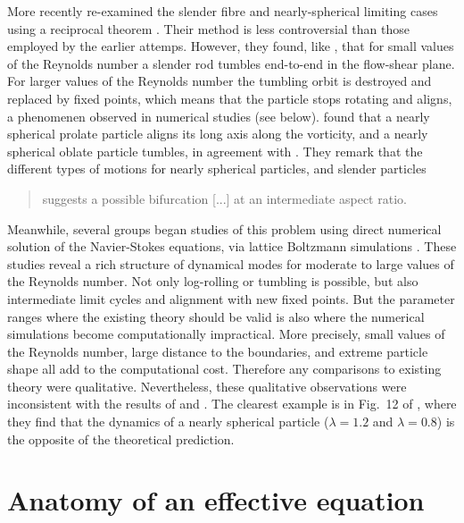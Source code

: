 \documentclass[thesis.tex]{subfiles}
\begin{document}
More recently \citet{subramanian2005,subramanian2006} re-examined the slender fibre and nearly-spherical limiting cases using a reciprocal theorem \cite{kim1991,lovalenti1993}. Their method is less controversial than those employed by the earlier attemps. However, they found, like \citet{harper1968}, that for small values of the Reynolds number a slender rod tumbles end-to-end in the flow-shear plane. For larger values of the Reynolds number the tumbling orbit is destroyed and replaced by fixed points, which means that the particle stops rotating and aligns, a phenomenen observed in numerical studies \cite{ding2000} (see below). \citet{subramanian2006} found that a nearly spherical prolate particle aligns its long axis along the vorticity, and a nearly spherical oblate particle tumbles, in agreement with \citet{saffman1956}. They remark that the different types of motions for nearly spherical particles, and slender particles \blockquote{suggests a possible bifurcation [...] at an intermediate aspect ratio.}

Meanwhile, several groups began studies of this problem using direct numerical solution of the Navier-Stokes equations, via lattice Boltzmann simulations \cite{feng1995,ding2000,qi2003,yu2007,huang2012,rosen2014,mao2014,rosen2015a,rosen2015b}. These studies reveal a rich structure of dynamical modes for moderate to large values of the Reynolds number. Not only log-rolling or tumbling is possible, but also intermediate limit cycles and alignment with new fixed points.
But the parameter ranges where the existing theory should be valid is also where the numerical simulations become computationally impractical. More precisely, small values of the Reynolds number, large distance to the boundaries, and extreme particle shape all add to the computational cost. Therefore any comparisons to existing theory were qualitative. Nevertheless, these qualitative observations were inconsistent with the results of \citet{saffman1956} and \cite{subramanian2006}. The clearest example is in Fig.~12 of \citet{mao2014}, where they find that the dynamics of a nearly spherical particle ($\lambda=1.2$ and $\lambda=0.8$) is the opposite of the theoretical prediction. 





\section{Anatomy of an effective equation}
\end{document}
